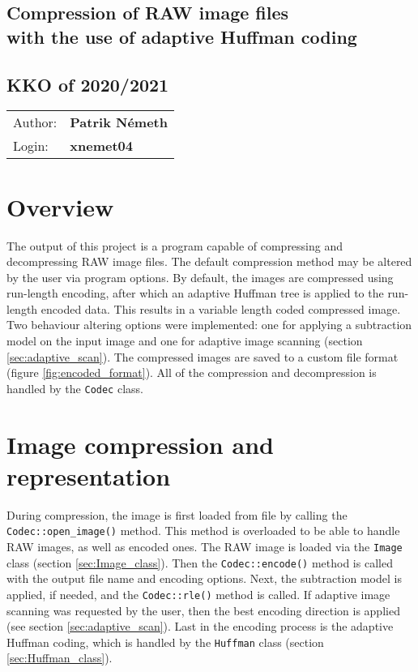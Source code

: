 \documentclass[pdftex, 11pt, a4paper, titlepage]{article}
\newcommand{\code}{\texttt}
\begin{document}
    \begin{center}
        \section*{Compression of RAW image files\\with the use of adaptive Huffman coding}
        \subsection*{KKO of 2020/2021}
        \begin{tabular}{ l l }
            Author: & \textbf{Patrik Németh} \\
            Login: & \textbf{xnemet04}
        \end{tabular}
    \end{center}

    \section{Overview}
    The output of this project is a program capable of compressing and decompressing RAW image files.
    The default compression method may be altered by the user via program options. By default, the
    images are compressed using run-length encoding, after which an adaptive Huffman tree is applied
    to the run-length encoded data. This results in a variable length coded compressed image.
    Two behaviour altering options were implemented: one for applying a subtraction model on the input
    image and one for adaptive image scanning (section \ref{sec:adaptive_scan}).
    The compressed images are saved to a custom file format (figure \ref{fig:encoded_format}).
    All of the compression and decompression is handled by the \code{Codec} class.

    \section{Image compression and representation}
    During compression, the image is first loaded from file by calling the \code{Codec::open\_image()} method.
    This method is overloaded to be able to handle RAW images, as well as encoded ones. The RAW image
    is loaded via the \code{Image} class (section \ref{sec:Image_class}). Then the \code{Codec::encode()}
    method is called with the output file name and encoding options. Next, the subtraction model is applied,
    if needed, and the \code{Codec::rle()} method is called. If adaptive image scanning was requested by the user,
    then the best encoding direction is applied (see section \ref{sec:adaptive_scan}). Last in the
    encoding process is the adaptive Huffman coding, which is handled by the \code{Huffman} class
    (section \ref{sec:Huffman_class}).
\end{document}
